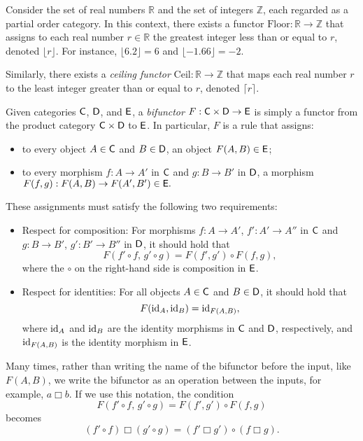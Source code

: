 \begin{example}
  Consider the set of real numbers $\mathbb{R}$ and the set of integers $\mathbb{Z}$, each regarded as a partial order category. In this context, there exists a functor $\mathrm{Floor} : \mathbb{R} \to \mathbb{Z} $ that assigns to each real number $r \in \mathbb{R}$ the greatest integer less than or equal to $r$, denoted $\lfloor r \rfloor$. For instance, $\lfloor 6.2 \rfloor = 6$ and $\lfloor -1.66 \rfloor = -2$. 

Similarly, there exists a \emph{ceiling functor} $\mathrm{Ceil} : \mathbb{R} \to \mathbb{Z}$ that maps each real number $r$ to the least integer greater than or equal to $r$, denoted $\lceil r \rceil$.


\end{example}


\begin{definition}
  Given categories $\mathsf{C}$, $\mathsf{D}$, and $\mathsf{E}$, a \emph{bifunctor}
$F : \mathsf{C} \times \mathsf{D} \to \mathsf{E}$
is simply a functor from the product category $\mathsf{C} \times \mathsf{D}$ to $\mathsf{E}$. In particular, $F$ is a rule that assigns:
\begin{itemize}
    \item to every object $A \in \mathsf{C}$ and $B \in \mathsf{D}$, an object $F(A, B) \in \mathsf{E}$;
    \item to every morphism $f : A \to A'$ in $\mathsf{C}$ and $g : B \to B'$ in $\mathsf{D}$, a morphism
    $F(f, g) : F(A, B) \to F(A', B') \in \mathsf{E}.$
\end{itemize}

These assignments must satisfy the following two requirements:

\begin{itemize}
    \item Respect for composition:  
    For morphisms $f : A \to A'$, $f' : A' \to A''$ in $\mathsf{C}$ and $g : B \to B'$, $g' : B' \to B''$ in $\mathsf{D}$, it should hold that
    \[
    F(f' \circ f,\, g' \circ g) = F(f', g') \circ F(f, g),
    \]
    where the $\circ$ on the right-hand side is composition in $\mathsf{E}$.

    \item Respect for identities:  
    For all objects $A \in \mathsf{C}$ and $B \in \mathsf{D}$, it should hold that
    \[
    F(\mathrm{id}_A, \mathrm{id}_B) = \mathrm{id}_{F(A, B)},
    \]
    where $\mathrm{id}_A$ and $\mathrm{id}_B$ are the identity morphisms in $\mathsf{C}$ and $\mathsf{D}$, respectively, and $\mathrm{id}_{F(A, B)}$ is the identity morphism in $\mathsf{E}$.
\end{itemize}

Many times, rather than writing the name of the bifunctor before the input, like $F(A, B)$, we write the bifunctor as an operation between the inputs, for example, $a \mathbin{\Box} b$. If we use this notation, the condition
\[
F(f' \circ f,\, g' \circ g) = F(f', g') \circ F(f, g)
\]
becomes
\[
(f' \circ f) \mathbin{\Box} (g' \circ g) = (f' \mathbin{\Box} g') \circ (f \mathbin{\Box} g).
\]
\end{definition}

